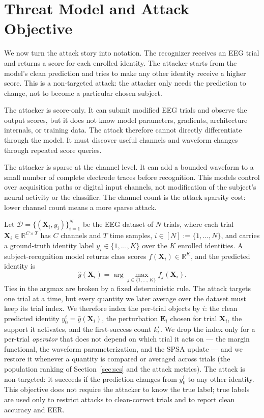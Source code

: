 \documentclass[journal]{IEEEtran}
\begin{document}
\section{Threat Model and Attack Objective}

We now turn the attack story into notation. The recognizer receives an EEG trial and returns a score for each enrolled identity. The attacker starts from the model's clean prediction and tries to make any other identity receive a higher score. This is a non-targeted attack: the attacker only needs the prediction to change, not to become a particular chosen subject.

The attacker is score-only. It can submit modified EEG trials and observe the output scores, but it does not know model parameters, gradients, architecture internals, or training data. The attack therefore cannot directly differentiate through the model. It must discover useful channels and waveform changes through repeated score queries.

The attacker is sparse at the channel level. It can add a bounded waveform to a small number of complete electrode traces before recognition. This models control over acquisition paths or digital input channels, not modification of the subject's neural activity or the classifier. The channel count is the attack sparsity cost: lower channel count means a more sparse attack.

Let $\mathcal{D}=\{(\mathbf{X}_i,y_i)\}_{i=1}^{N}$ be the EEG dataset of $N$ trials, where each trial $\mathbf{X}_i\in\mathbb{R}^{C\times T}$ has $C$ channels and $T$ time samples, $i\in[N]:=\{1,\ldots,N\}$, and carries a ground-truth identity label $y_i\in\{1,\ldots,K\}$ over the $K$ enrolled identities. A subject-recognition model returns class scores $f(\mathbf{X}_i)\in\mathbb{R}^{K}$, and the predicted identity is
\begin{equation}
\hat{y}(\mathbf{X}_i)=\arg\max_{j\in\{1,\ldots,K\}} f_j(\mathbf{X}_i).
\end{equation}
Ties in the argmax are broken by a fixed deterministic rule.
The attack targets one trial at a time, but every quantity we later average over the dataset must keep its trial index. We therefore index the per-trial objects by $i$: the clean predicted identity $y_0^i=\hat{y}(\mathbf{X}_i)$, the perturbation $\mathbf{E}_i$ chosen for trial $\mathbf{X}_i$, the support it activates, and the first-success count $k_i^\star$. We drop the index only for a per-trial \emph{operator} that does not depend on which trial it acts on --- the margin functional, the waveform parameterization, and the SPSA update --- and we restore it whenever a quantity is compared or averaged across trials (the population ranking of Section~\ref{sec:scs} and the attack metrics). The attack is non-targeted: it succeeds if the prediction changes from $y_0^i$ to any other identity. This objective does not require the attacker to know the true label; true labels are used only to restrict attacks to clean-correct trials and to report clean accuracy and EER.
\end{document}
